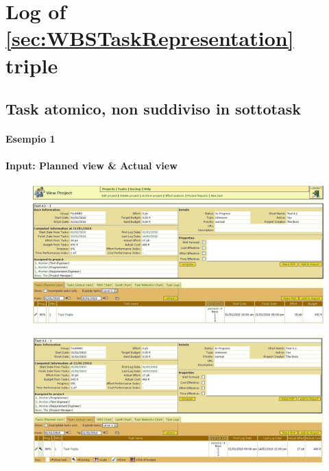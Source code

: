 \newpage

\section{Log of \ref{sec:WBSTaskRepresentation} triple}



\subsection{Task atomico, non suddiviso in sottotask}
\paragraph{Esempio 1}
\paragraph{Input: Planned view & Actual view}
\begin{figure}[h!]
\centering
\includegraphics[width=\textwidth]{tests/TEST_WBS/4.1/4.1_1/Esempio_1/input.png}
\end{figure}
\begin{figure}[h!]
\centering
\includegraphics[width=\textwidth]{tests/TEST_WBS/4.1/4.1_1/Esempio_1/input_actual.png}
\end{figure}
\newpage

